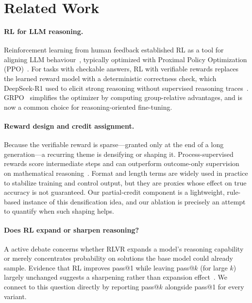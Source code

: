 \documentclass[11pt]{article}
\begin{document}
\section{Related Work}
\paragraph{RL for LLM reasoning.}
Reinforcement learning from human feedback established RL as a tool for aligning
LLM behaviour~\citep{instructgpt}, typically optimized with Proximal Policy
Optimization (PPO)~\citep{ppo}. For tasks with checkable answers, RL with
verifiable rewards replaces the learned reward model with a deterministic
correctness check, which DeepSeek-R1 used to elicit strong reasoning without
supervised reasoning traces~\citep{deepseekr1}. GRPO~\citep{deepseekmath}
simplifies the optimizer by computing group-relative advantages, and is now a
common choice for reasoning-oriented fine-tuning.

\paragraph{Reward design and credit assignment.}
Because the verifiable reward is sparse---granted only at the end of a long
generation---a recurring theme is densifying or shaping it. Process-supervised
rewards score intermediate steps and can outperform outcome-only supervision on
mathematical reasoning~\citep{lightman2023}. Format and length terms are widely
used in practice to stabilize training and control output, but they are proxies
whose effect on true accuracy is not guaranteed. Our partial-credit component is
a lightweight, rule-based instance of this densification idea, and our ablation
is precisely an attempt to quantify when such shaping helps.

\paragraph{Does RL expand or sharpen reasoning?}
A active debate concerns whether RLVR expands a model's reasoning capability or
merely concentrates probability on solutions the base model could already
sample. Evidence that RL improves pass@1 while leaving pass@$k$ (for large $k$)
largely unchanged suggests a sharpening rather than expansion
effect~\citep{yue2025}. We connect to this question directly by reporting
pass@$k$ alongside pass@1 for every variant.
\end{document}

